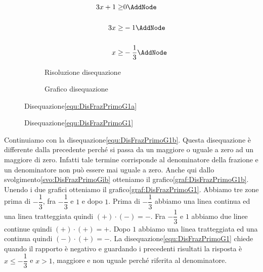 \begin{figure}
	\centering
	\begin{subfigure}[]{\linewidth}
		\begin{NodesList}
			\centering
			\begin{align*}
				3x+1\geq& 0\AddNode\\[.5cm]
				3x\geq&-1\AddNode\\[.5cm]
				x\geq&-\dfrac{1}{3}\AddNode
			\end{align*}
		\end{NodesList}
		\caption{Risoluzione disequazione}
		\label{svo:DisFrazPrimoG1a}
	\end{subfigure}%
	\qquad
	\begin{subfigure}[]{\linewidth}
		\centering
		\caption{Grafico disequazione}
		\label{graf:DisFrazPrimoG1a}
	\end{subfigure}%
	\captionsetup{format=esempio,list=no}
	\caption{Disequazione\nobs\vref{equ:DisFrazPrimoG1a}}
	\label{esempio:DisFrazPrimoG1a}
\end{figure}
     \begin{figure}
	\centering
	\captionsetup{format=esempio,list=no}
	\caption{Disequazione\nobs\vref{equ:DisFrazPrimoG1}}
	\label{graf:DisFrazPrimoG1}
\end{figure}
Continuiamo con la disequazione\nobs\vref{equ:DisFrazPrimoG1b}.
Questa disequazione è differente dalla precedente perché si passa da un maggiore o uguale a zero ad un maggiore di zero. Infatti tale termine corrisponde al denominatore della frazione e un denominatore non può essere mai uguale a zero. Anche 
qui dallo svolgimento\nobs\vref{svo:DisFrazPrimoGìb} otteniamo il grafico\nobs\vref{graf:DisFrazPrimoG1b}. Unendo i due grafici otteniamo il grafico\nobs\vref{graf:DisFrazPrimoG1}. Abbiamo tre zone prima di $-\dfrac{1}{3}$, fra $-\dfrac{1}{3}$ e $1$  e dopo $1$. Prima di $-\dfrac{1}{3}$ abbiamo una linea continua ed una linea tratteggiata quindi $(+)\cdot(-)=-$. Fra $-\dfrac{1}{3}$ e $1$ abbiamo due linee continue quindi $(+)\cdot(+)=+$. Dopo $1$ abbiamo una linea tratteggiata ed una continua quindi $(-)\cdot(+)=-$. La disequazione\nobs\vref{equ:DisFrazPrimoG1} chiede quando il rapporto è negativo e guardando i precedenti risultati la risposta è $x\leq -\dfrac{1}{3}$ e $x>1$, maggiore e non uguale perché riferita al denominatore.  

